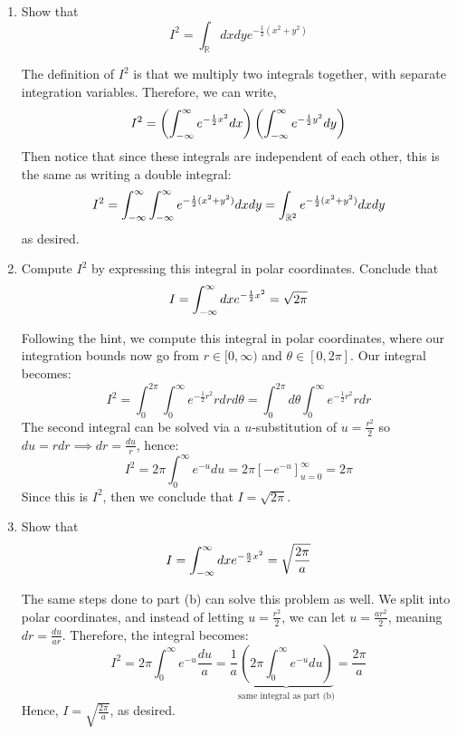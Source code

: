\documentclass[10pt]{article}
\begin{document}
	\begin{enumerate}[label=\alph*)]
		\item Show that
			\[
				I^2 = \int_{\mathbb R} dx dy e^{-\frac{1}{2}(x^2 + y^2)}
			\] 
			\begin{solution}
				The definition of $I^2$ is that we multiply two integrals together, with separate 
				integration variables. Therefore, we can write,
				\begin{align*}
					I^2 = \left( \int_{-\infty}^{\infty} e^{-\frac{1}{2}x^2} dx \right) 
					\left( \int_{-\infty}^{\infty} e^{-\frac{1}{2}y^2} dy \right) 
				\end{align*}
				Then notice that since these integrals are independent of each other, this is the same 
				as writing a double integral:
				\[
					I^2 = \int_{-\infty}^{\infty} \int_{-\infty}^{\infty} e^{-\frac{1}{2}(x^2 + y^2)} dx dy = \int_{\mathbb R^2} 
					e^{-\frac{1}{2}(x^2 + y^2)} dx dy
				\] 
				as desired.
			\end{solution}
		\item Compute $I^2$ by expressing this integral in polar coordinates. Conclude that
			\[
				I = \int_{-\infty}^{\infty} dx e^{-\frac{1}{2}x^2} = \sqrt{2\pi} 
			\] 
			\begin{solution}
				Following the hint, we compute this integral in polar coordinates, where our 
				integration bounds now go from $r \in [0, \infty)$ and $\theta \in [0, 2\pi]$. Our 
				integral becomes:
				\[
					I^2 = \int_{0}^{2\pi}\int_0^\infty e^{-\frac{1}{2}r^2} r dr d\theta 
					= \int_0^{2\pi} d\theta \int_0^\infty e^{-\frac{1}{2}r^2} r dr
				\] 
				The second integral can be solved via a $u$-substitution of $u = \frac{r^2}{2}$ so 
				$du = r dr \implies dr = \frac{du}{r}$, hence:
				\[
					I^2 = 2\pi \int_0^\infty e^{-u} du = 2\pi \left[-e^{-u}\right]_{u = 0}^\infty = 2\pi
				\] 
				Since this is $I^2$, then we conclude that $I = \sqrt{2\pi}$.
			\end{solution}
		\item Show that 
			\[
				I = \int_{-\infty}^{\infty} dx e^{-\frac{a}{2}x^2} = \sqrt{\frac{2\pi}{a}} 
			\] 
			\begin{solution}
				The same steps done to part (b) can solve this problem as well. We split into polar coordinates,
				and instead of letting $u = \frac{r^2}{2}$, we can let $u = \frac{ar^2}{2}$, meaning 
				$dr = \frac{du}{ar}$. Therefore, the integral becomes:
				\[
					I^2 = 2\pi \int_0^\infty e^{-u} \frac{du}{a} = \frac{1}{a}\underbrace{\left( 2\pi \int_0^\infty 
					e^{-u} du \right)}_{\text{same integral as part (b)}} = \frac{2\pi}{a}
				\] 
				Hence, $I = \sqrt{\frac{2\pi}{a}}$, as desired.

\end{solution}
\end{enumerate}
\end{document}
